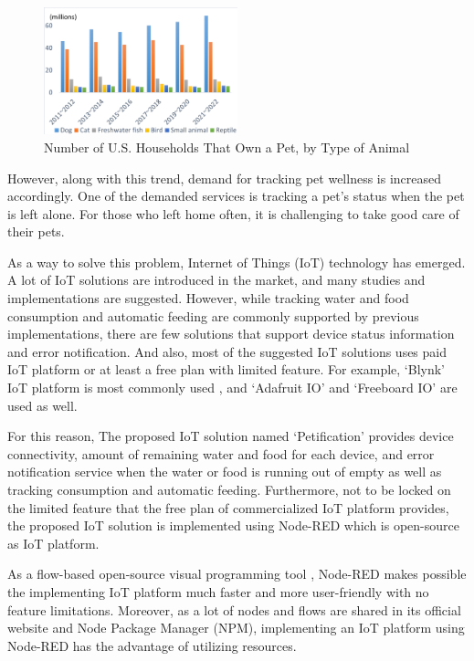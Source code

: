 \documentclass[conference]{IEEEtran}
\begin{document}
\begin{figure}[htbp]
\centerline{\includegraphics[width=0.5\textwidth]{./images/fig 1.png}}
\caption{Number of U.S. Households That Own a Pet, by Type of Animal
}
\label{fig}
\end{figure}

However, along with this trend, demand for tracking pet wellness is increased accordingly. One of the demanded services is tracking a pet’s status when the pet is left alone. For those who left home often, it is challenging to take good care of their pets.

\indent As a way to solve this problem, Internet of Things (IoT) technology has emerged. A lot of IoT solutions are introduced in the market, and many studies and implementations are suggested. However, while tracking water and food consumption and automatic feeding are commonly supported by previous implementations, there are few solutions that support device status information and error notification. And also, most of the suggested IoT solutions uses paid IoT platform or at least a free plan with limited feature. For example, ‘Blynk’ IoT platform is most commonly used \cite{b2, b3, b4, b5}, and ‘Adafruit IO’ \cite{b6} and ‘Freeboard IO’ \cite{b7} are used as well.

For this reason, The proposed IoT solution named ‘Petification’ provides device connectivity, amount of remaining water and food for each device, and error notification service when the water or food is running out of empty as well as tracking consumption and automatic feeding. Furthermore, not to be locked on the limited feature that the free plan of commercialized IoT platform provides, the proposed IoT solution is implemented using Node-RED which is open-source as IoT platform.

\indent As a flow-based open-source visual programming tool \cite{b8}, Node-RED makes possible the implementing IoT platform much faster and more user-friendly with no feature limitations. Moreover, as a lot of nodes and flows are shared in its official website and Node Package Manager (NPM), implementing an IoT platform using Node-RED has the advantage of utilizing resources.
\end{document}
